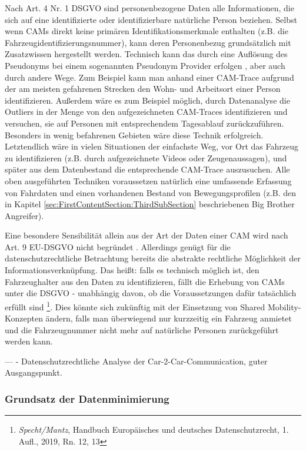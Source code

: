Nach Art. 4 Nr. 1 DSGVO sind personenbezogene Daten alle Informationen, die sich auf eine identifizierte oder identifizierbare natürliche Person beziehen. Selbst wenn CAMs direkt keine primären Identifikationsmerkmale enthalten (z.B. die Fahrzeugidentifizierungsnummer), kann deren Personenbezug grundsätzlich mit Zusatzwissen hergestellt werden. Technisch kann das durch eine Auflösung des Pseudonyms bei einem sogenannten Pseudonym Provider erfolgen \cite{Kiometzis2017}, aber auch durch andere Wege. Zum Beispiel kann man anhand einer CAM-Trace aufgrund der am meisten gefahrenen Strecken den Wohn- und Arbeitsort einer Person identifizieren. Außerdem wäre es zum Beispiel möglich, durch Datenanalyse die Outliers in der Menge von den aufgezeichneten CAM-Traces identifizieren und versuchen, sie auf Personen mit entsprechendem Tagesablauf zurückzuführen. Besonders in wenig befahrenen Gebieten wäre diese Technik erfolgreich. Letztendlich wäre in vielen Situationen der einfachste Weg, vor Ort das Fahrzeug zu identifizieren (z.B. durch aufgezeichnete Videos oder Zeugenaussagen), und später aus dem Datenbestand die entsprechende CAM-Trace auszusuchen. Alle oben ausgeführten Techniken voraussetzen natürlich eine umfassende Erfassung von Fahrdaten und einen vorhandenen Bestand von Bewegungsprofilen (z.B. den in Kapitel \ref{sec:FirstContentSection:ThirdSubSection} beschriebenen Big Brother Angreifer).

Eine besondere Sensibilität allein aus der Art der Daten einer CAM wird nach Art. 9 EU-DSGVO nicht begründet \cite{Weichert2016}. Allerdings genügt für die datenschutzrechtliche Betrachtung bereits die abstrakte rechtliche Möglichkeit der Informationsverknüpfung. Das heißt: falls es technisch möglich ist, den Fahrzeughalter aus den Daten zu identifizieren, fällt die Erhebung von CAMs unter die DSGVO - unabhängig davon, ob die Voraussetzungen dafür tatsächlich erfüllt sind  \footnote{\emph{Specht/Mantz}, Handbuch Europäisches und deutsches Datenschutzrecht, 1. Aufl.,  2019, Rn. 12, 13}. Dies könnte sich zukünftig mit der Einsetzung von Shared Mobility-Konzepten ändern, falls man überwiegend nur kurzzeitig ein Fahrzeug anmietet und die Fahrzeugnummer nicht mehr auf natürliche Personen zurückgeführt werden kann. 

--- 
\cite{Weichert2016} - Datenschutzrechtliche Analyse der Car-2-Car-Communication, guter Ausgangspunkt.

\subsubsection{Grundsatz der Datenminimierung}



